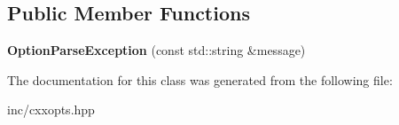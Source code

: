 \subsection*{Public Member Functions}
\begin{DoxyCompactItemize}
\item 
{\bfseries Option\+Parse\+Exception} (const std\+::string \&message)\hypertarget{classcxxopts_1_1OptionParseException_a5a29d9742ef8d0edc05c46d942debd05}{}\label{classcxxopts_1_1OptionParseException_a5a29d9742ef8d0edc05c46d942debd05}

\end{DoxyCompactItemize}


The documentation for this class was generated from the following file\+:\begin{DoxyCompactItemize}
\item 
inc/cxxopts.\+hpp\end{DoxyCompactItemize}

